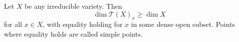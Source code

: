 Let $X$ be any irreducible variety. Then
$$\dim \mathcal{T}(X)_x \geqslant \dim X$$
for all $x \in X$, with equality holding for $x$ in some dense open subset. Points where equality holds are called simple points.
